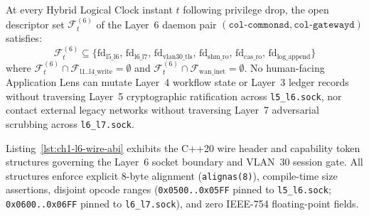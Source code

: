 \begin{invariant}
\label{inv:ch1-l6-bilateral-containment}
At every Hybrid Logical Clock instant $t$ following privilege drop, the open descriptor set
$\mathcal{F}_t^{(6)}$ of the Layer~6 daemon pair $(\texttt{col-commonsd}, \texttt{col-gatewayd})$
satisfies:
\begin{equation}
\mathcal{F}_t^{(6)} \subseteq \bigl\{
\mathrm{fd}_{\mathrm{l5\_l6}}, \,
\mathrm{fd}_{\mathrm{l6\_l7}}, \,
\mathrm{fd}_{\mathrm{vlan30\_tls}}, \,
\mathrm{fd}_{\mathrm{shm\_ro}}, \,
\mathrm{fd}_{\mathrm{cas\_ro}}, \,
\mathrm{fd}_{\mathrm{log\_append}}
\bigr\}
\end{equation}
where $\mathcal{F}_t^{(6)} \cap \mathcal{F}_{\mathrm{l1..l4\_write}} = \emptyset$ and
$\mathcal{F}_t^{(6)} \cap \mathcal{F}_{\mathrm{wan\_inet}} = \emptyset$. No human-facing
Application Lens can mutate Layer~4 workflow state or Layer~3 ledger records without traversing
Layer~5 cryptographic ratification across \texttt{l5\_l6.sock}, nor contact external legacy
networks without traversing Layer~7 adversarial scrubbing across \texttt{l6\_l7.sock}.
\end{invariant}

Listing~\ref{lst:ch1-l6-wire-abi} exhibits the C++20 wire header and capability token structures
governing the Layer~6 socket boundary and VLAN~30 session gate. All structures enforce explicit
8-byte alignment (\texttt{alignas(8)}), compile-time size assertions, disjoint opcode ranges
(\texttt{0x0500..0x05FF} pinned to \texttt{l5\_l6.sock}; \texttt{0x0600..0x06FF} pinned to
\texttt{l6\_l7.sock}), and zero IEEE-754 floating-point fields.

